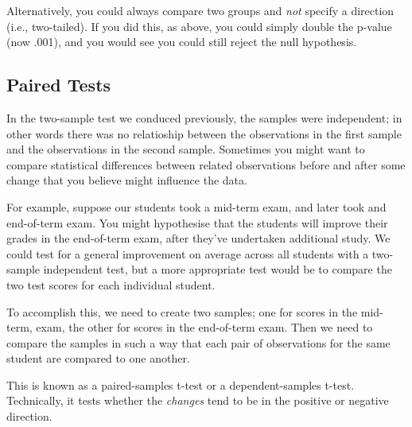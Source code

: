 \documentclass[11pt]{article}
\begin{document}
Alternatively, you could always compare two groups and \emph{not}
specify a direction (i.e., two-tailed). If you did this, as above, you
could simply double the p-value (now .001), and you would see you could
still reject the null hypothesis.

    \subsection{Paired Tests}\label{paired-tests}

In the two-sample test we conduced previously, the samples were
independent; in other words there was no relatioship between the
observations in the first sample and the observations in the second
sample. Sometimes you might want to compare statistical differences
between related observations before and after some change that you
believe might influence the data.

For example, suppose our students took a mid-term exam, and later took
and end-of-term exam. You might hypothesise that the students will
improve their grades in the end-of-term exam, after they've undertaken
additional study. We could test for a general improvement on average
across all students with a two-sample independent test, but a more
appropriate test would be to compare the two test scores for each
individual student.

To accomplish this, we need to create two samples; one for scores in the
mid-term, exam, the other for scores in the end-of-term exam. Then we
need to compare the samples in such a way that each pair of observations
for the same student are compared to one another.

This is known as a paired-samples t-test or a dependent-samples t-test.
Technically, it tests whether the \emph{changes} tend to be in the
positive or negative direction.
\end{document}
